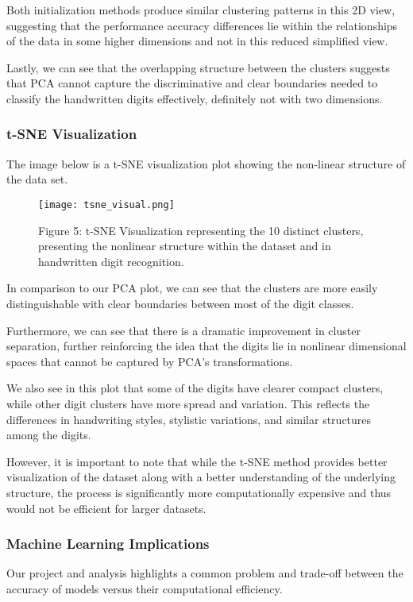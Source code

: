 \documentclass{article}
\begin{document}
Both initialization methods produce similar clustering patterns in this 2D view, suggesting that the performance accuracy differences lie within the relationships of the data in some higher dimensions and not in this reduced simplified view.

Lastly, we can see that the overlapping structure between the clusters suggests that PCA cannot capture the discriminative and clear boundaries needed to classify the handwritten digits effectively, definitely not with two dimensions. 

\subsubsection{t-SNE Visualization}
The image below is a t-SNE visualization plot showing the non-linear structure of the data set. 

\begin{figure}[H]
  \centering
  \texttt{[image: tsne\_visual.png]}
  \caption*{Figure 5: t-SNE Visualization representing the 10 distinct clusters, presenting the nonlinear structure within the dataset and in handwritten digit recognition.}
\end{figure}

In comparison to our PCA plot, we can see that the clusters are more easily distinguishable with clear boundaries between most of the digit classes. 

Furthermore, we can see that there is a dramatic improvement in cluster separation, further reinforcing the idea that the digits lie in nonlinear dimensional spaces that cannot be captured by PCA's transformations. 

We also see in this plot that some of the digits have clearer compact clusters, while other digit clusters have more spread and variation. This reflects the differences in handwriting styles, stylistic variations, and similar structures among the digits. 

However, it is important to note that while the t-SNE method provides better visualization of the dataset along with a better understanding of the underlying structure, the process is significantly more computationally expensive and thus would not be efficient for larger datasets. 

\subsubsection{Machine Learning Implications}
Our project and analysis highlights a common problem and trade-off between the accuracy of models versus their computational efficiency. 
\end{document}
